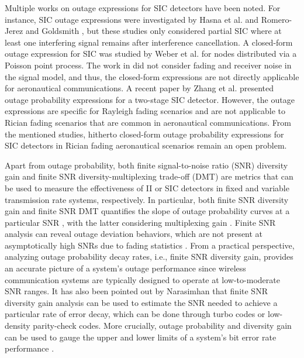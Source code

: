 Multiple works on outage expressions for SIC detectors have been noted. For instance, SIC outage expressions were investigated by Hasna et al. \cite{hasna2003performance} and Romero-Jerez and Goldsmith \cite{romero2008receive}, but these studies only considered partial SIC where at least one interfering signal remains after interference cancellation. A closed-form outage expression for SIC was studied by Weber et al. \cite{weber2007transmission} for nodes distributed via a Poisson point process. The work in \cite{weber2007transmission} did not consider fading and receiver noise in the signal model, and thus, the closed-form expressions are not directly applicable for aeronautical communications. A recent paper by Zhang et al. \cite{zhang2017full} presented outage probability expressions for a two-stage SIC detector. However, the outage expressions are specific for Rayleigh fading scenarios and are not applicable to Rician fading scenarios that are common in aeronautical communications. From the mentioned studies, hitherto closed-form outage probability expressions for SIC detectors in Rician fading aeronautical scenarios remain an open problem.

Apart from outage probability, both finite signal-to-noise ratio (SNR) diversity gain and finite SNR diversity-multiplexing trade-off (DMT) are metrics that can be used to measure the effectiveness of II or SIC detectors in fixed and variable transmission rate systems, respectively. In particular, both finite SNR diversity gain and finite SNR DMT quantifies the slope of outage probability curves at a particular SNR \cite{shin2008diversity}, with the latter considering multiplexing gain \cite{narasimhan2006finite}. Finite SNR analysis can reveal outage deviation behaviors, which are not present at asymptotically high SNRs due to fading statistics \cite{shin2008diversity}. From a practical perspective, analyzing outage probability decay rates, i.e., finite SNR diversity gain, provides an accurate picture of a system's outage performance since wireless communication systems are typically designed to operate at low-to-moderate SNR ranges. It has also been pointed out by Narasimhan \cite{narasimhan2006finite} that finite SNR diversity gain analysis can be used to estimate the SNR needed to achieve a particular rate of error decay, which can be done through turbo codes or low-density parity-check codes. More crucially, outage probability and diversity gain can be used to gauge the upper and lower limits of a system's bit error rate performance \cite{zheng2003diversity,nabar2005diversity}. 

